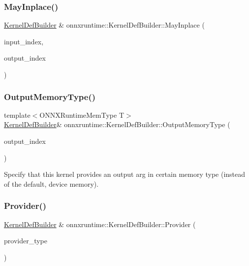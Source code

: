 \subsubsection{\texorpdfstring{May\+Inplace()}{MayInplace()}\hspace{0.1cm}{\footnotesize\ttfamily [2/2]}}
{\footnotesize\ttfamily \mbox{\hyperlink{classonnxruntime_1_1KernelDefBuilder}{Kernel\+Def\+Builder}} \& onnxruntime\+::\+Kernel\+Def\+Builder\+::\+May\+Inplace (\begin{DoxyParamCaption}\item[{int}]{input\+\_\+index,  }\item[{int}]{output\+\_\+index }\end{DoxyParamCaption})}

\mbox{\label{classonnxruntime_1_1KernelDefBuilder_a07b8f5af0f2e23ea09c3f9c0b52dc227}} 
\subsubsection{\texorpdfstring{Output\+Memory\+Type()}{OutputMemoryType()}}
{\footnotesize\ttfamily template$<$O\+N\+N\+X\+Runtime\+Mem\+Type T$>$ \\
\mbox{\hyperlink{classonnxruntime_1_1KernelDefBuilder}{Kernel\+Def\+Builder}}\& onnxruntime\+::\+Kernel\+Def\+Builder\+::\+Output\+Memory\+Type (\begin{DoxyParamCaption}\item[{int}]{output\+\_\+index }\end{DoxyParamCaption})\hspace{0.3cm}{\ttfamily [inline]}}

Specify that this kernel provides an output arg in certain memory type (instead of the default, device memory). \mbox{\label{classonnxruntime_1_1KernelDefBuilder_a4c611ef799829acfb5840ba54b674bbc}} 
\subsubsection{\texorpdfstring{Provider()}{Provider()}\hspace{0.1cm}{\footnotesize\ttfamily [1/2]}}
{\footnotesize\ttfamily \mbox{\hyperlink{classonnxruntime_1_1KernelDefBuilder}{Kernel\+Def\+Builder}} \& onnxruntime\+::\+Kernel\+Def\+Builder\+::\+Provider (\begin{DoxyParamCaption}\item[{\mbox{\hyperlink{namespaceonnxruntime_a863e2227cbf32aab76aad35fdadff4bb}{onnxruntime\+::\+Provider\+Type}}}]{provider\+\_\+type }\end{DoxyParamCaption})}

